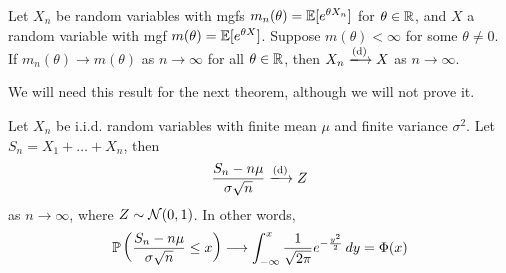 \documentclass{../../template/note}
\begin{document}
    \begin{proposition}
        Let \(X_n\) be random variables with mgfs \(m_n(\theta) = \mathbb E[e^{\theta X_n}]\) for \(\theta \in \mathbb R\), and \(X\) a random variable with mgf \(m(\theta) = \mathbb E[e^{\theta X}]\). Suppose \(m(\theta) < \infty\) for some \(\theta \neq 0\). If \(m_n(\theta) \to m(\theta)\) as \(n \to \infty\) for all \(\theta \in \mathbb R\), then \(X_n \dto X\) as \(n \to \infty\).
    \end{proposition}

    We will need this result for the next theorem, although we will not prove it.
    
    \begin{theorem}
        Let \(X_n\) be i.i.d. random variables with finite mean \(\mu\) and finite variance \(\sigma^2\). Let \(S_n = X_1 + \dots + X_n\), then
        \begin{align*}
            \frac{S_n-n\mu}{\sigma \sqrt n} \dto Z
        \end{align*}
        as \(n \to \infty\), where \(Z \sim \mathcal{N}(0, 1)\). In other words,
        \begin{align*}
            \mathbb P\left(\frac{S_n-n\mu}{\sigma \sqrt n} \leq x\right) \longrightarrow \int_{-\infty}^x \frac{1}{\sqrt{2\pi}} e^{-\frac{y^2}2} \,d{y} = \Phi(x)
        \end{align*}
    \end{theorem}
    
\end{document}
